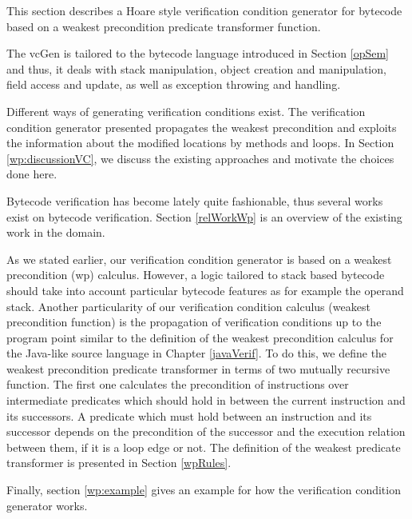 
This section describes a Hoare style verification condition generator for bytecode based on a weakest precondition predicate transformer function.
 

The vcGen is tailored to the bytecode language introduced in Section \ref{opSem} and thus, it deals
with stack manipulation, object creation and manipulation, field access and update, as well as exception throwing and handling.

Different ways of generating verification conditions exist. The verification condition
 generator presented  propagates the weakest precondition and exploits the information 
about the modified locations by methods and loops. 
In Section \ref{wp:discussionVC}, we discuss the existing approaches and motivate the choices done here.

Bytecode verification has become lately quite fashionable, thus several works exist on bytecode verification. Section \ref{relWorkWp}
is an overview of the existing work in the domain.


As we stated earlier, our verification condition generator is based on a weakest precondition (wp) calculus.
 However, a logic tailored to stack based bytecode should take into account 
particular bytecode features as for example the operand stack. Another particularity of our verification condition calculus (weakest precondition function)
is the propagation of verification conditions up to the program point similar to the definition of the weakest precondition calculus
for the Java-like  source language in Chapter \ref{javaVerif}. To do this, we define the  weakest precondition predicate transformer
in terms of two mutually recursive function. 
The first one calculates the precondition of instructions over intermediate predicates which should hold 
in between the current instruction and 
its successors. A predicate which must hold between an instruction and its successor 
depends on the precondition of the successor and the execution relation between them, if it is a loop edge or not.
The definition of the weakest predicate transformer  is presented in Section  \ref{wpRules}. 

Finally, section \ref{wp:example} gives an example for how the verification condition generator works.

 





 
